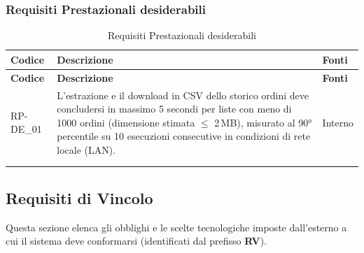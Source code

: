 \subsubsection{Requisiti Prestazionali desiderabili}
\renewcommand{\arraystretch}{1.15}
\begin{longtable}{|>{\raggedright}p{}|>{\raggedright\arraybackslash}p{}|>{\raggedright\arraybackslash}p{}|}
    \hline
    \rowcolor[gray]{0.9}
    \textbf{Codice} & \textbf{Descrizione} & \textbf{Fonti} \\
    \hline
    \endfirsthead
    \hline
    \rowcolor[gray]{0.9}
    \textbf{Codice} & \textbf{Descrizione} & \textbf{Fonti} \\
    \hline
    \endhead
    \hline
    RP-DE\_01 \hypertarget{rp-de_1} & L'estrazione e il download in CSV dello storico ordini deve concludersi in massimo 5 secondi per liste con meno di 1000 ordini (dimensione stimata $\leq$ 2\,MB), misurato al 90° percentile su 10 esecuzioni consecutive in condizioni di rete locale (LAN). & Interno \\
    \hline
    \multicolumn{3}{c}{} \\
    \caption{Requisiti Prestazionali desiderabili}\hypertarget{tab:prestazionali_desiderabili}\\
\end{longtable}

\newpage
\subsection{Requisiti di Vincolo}
Questa sezione elenca gli obblighi e le scelte tecnologiche imposte dall'esterno a cui il sistema deve conformarsi (identificati dal prefisso \textbf{RV}).

